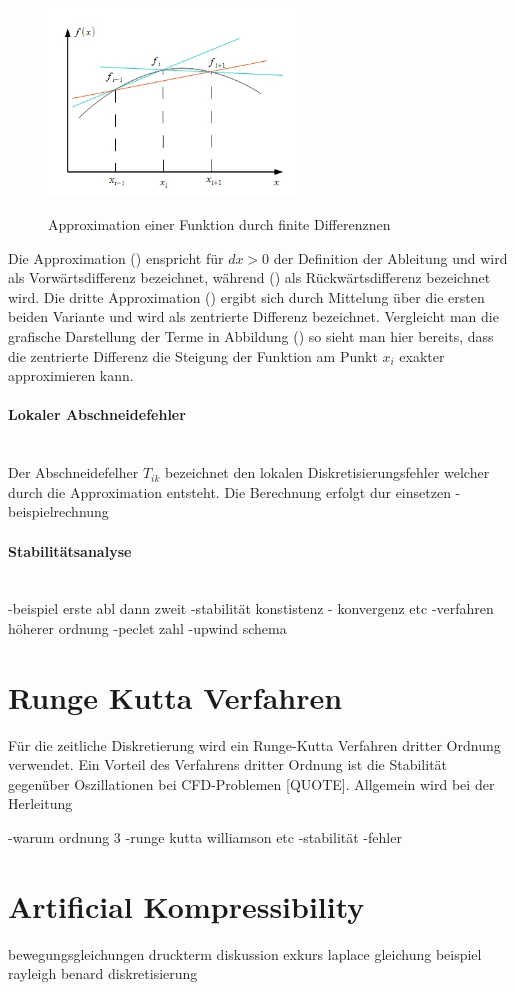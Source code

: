 \begin{figure}[!tpb]
  \centering
  \includegraphics[width=0.6\textwidth]{gfx/numerik/fd_dummy.png}\label{fig:fd_schema}
  \caption{Approximation einer Funktion durch finite Differenznen}
\end{figure}

Die Approximation () enspricht für $dx>0$ der Definition der Ableitung und wird als Vorwärtsdifferenz bezeichnet,
während () als Rückwärtsdifferenz bezeichnet wird.
Die dritte Approximation () ergibt sich durch Mittelung über die ersten beiden Variante und wird als zentrierte Differenz bezeichnet.
Vergleicht man die grafische Darstellung der Terme in Abbildung () so sieht man hier bereits,
dass die zentrierte Differenz die Steigung der Funktion am Punkt $x_i$ exakter approximieren kann.


\paragraph{Lokaler Abschneidefehler}\mbox{}\\

Der Abschneidefelher $T_{ik}$ bezeichnet den lokalen Diskretisierungsfehler welcher durch die Approximation entsteht.
Die Berechnung erfolgt dur einsetzen
-beispielrechnung


\paragraph{Stabilitätsanalyse}\mbox{}\\

-beispiel erste abl dann zweit
-stabilität konstistenz - konvergenz etc
-verfahren höherer ordnung
-peclet zahl
-upwind schema


\section{Runge Kutta Verfahren}
Für die zeitliche Diskretierung wird ein Runge-Kutta Verfahren dritter Ordnung verwendet.
Ein Vorteil des Verfahrens dritter Ordnung ist die Stabilität gegenüber Oszillationen bei CFD-Problemen [QUOTE].
Allgemein wird bei der Herleitung

-warum ordnung 3
-runge kutta williamson etc
-stabilität
-fehler

\newpage

\section{Artificial Kompressibility}
bewegungsgleichungen
druckterm diskussion
exkurs laplace gleichung
beispiel rayleigh benard diskretisierung

